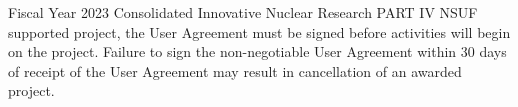 Fiscal Year 2023 Consolidated Innovative Nuclear Research PART IV NSUF
supported project, the User Agreement must be signed before activities will
begin on the project. Failure to sign the non-negotiable User Agreement within
30 days of receipt of the User Agreement may result in cancellation of an
awarded project.
